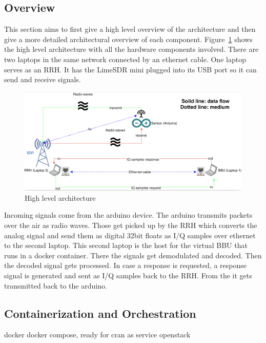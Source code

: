 \subsection{Overview}
This section aims to first give a high level overview of the architecture and then give a more detailed 
architectural overview of each component.
Figure~\ref{fig:high_level_arch} shows the high level architecture with all the hardware components involved.
There are two laptops in the same network connected by an ethernet cable. One laptop serves as an RRH. It has the LimeSDR mini 
plugged into its USB port so it can send and receive signals.
\begin{figure}[h]
    \centering
    \includegraphics[width=1\textwidth]{figures/high_level_arch.png}
    \caption{High level architecture}
    \label{fig:high_level_arch}
\end{figure}
Incoming signals come from the arduino device. The arduino transmits packets over the air as radio waves. Those get picked up 
by the RRH which converts the analog signal and send them as digital 32bit floats as I/Q samples over ethernet to the second laptop.
This second laptop is the host for the virtual BBU that runs in a docker container. There the signals get demodulated and decoded.
Then the decoded signal gets processed. In case a response is requested, a response signal is generated and sent as I/Q samples back to the RRH.
From the it gets transmitted back to the arduino.
\subsection{Containerization and Orchestration}
docker docker compose, ready for cran as service openstack
